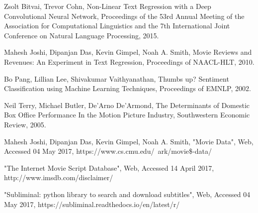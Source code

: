 \documentclass[11pt]{article}
\begin{document}
\begin{thebibliography}{9}

  Zsolt Bitvai, Trevor Cohn,
  Non-Linear Text Regression with a Deep Convolutional Neural Network,
  Proceedings of the 53rd Annual Meeting of the Association for Computational
  Linguistics and the 7th International Joint Conference on Natural Language Processing,
  2015.
    
  Mahesh Joshi, Dipanjan Das, Kevin Gimpel, Noah A. Smith,
  Movie Reviews and Revenues: An Experiment in Text Regression,
  Proceedings of NAACL-HLT,
  2010.
  
  Bo Pang, Lillian Lee, Shivakumar Vaithyanathan,
  Thumbs up? Sentiment Classification using Machine Learning Techniques,
  Proceedings of EMNLP,
  2002.
  
  Neil Terry, Michael Butler, De'Arno De'Armond,
  The Determinants of Domestic Box Office Performance In the Motion Picture Industry,
  Southwestern Economic Review,
  2005.
    
  Mahesh Joshi, Dipanjan Das, Kevin Gimpel, Noah A. Smith,
  "Movie Data",
  Web,
  Accessed 04 May 2017,
  https://www.cs.cmu.edu/~ark/movie\$-data/

    "The Internet Movie Script Database",
    Web,
    Accessed 14 April 2017,
    http://www.imsdb.com/disclaimer/
    
    "Subliminal: python library to search and download subtitles",
    Web,
    Accessed 04 May 2017,
    https://subliminal.readthedocs.io/en/latest/r/
  
\end{thebibliography}
\end{document}
